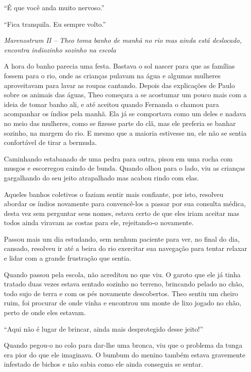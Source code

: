 ``É que você anda muito nervoso.''

``Fica tranquila. Eu sempre volto.''

\asterisc

\emph{Marenostrum II -- Theo toma banho de manhã no rio mas ainda está deslocado, encontra indiozinho sozinho na
escola}

A hora do banho parecia uma festa. Bastava o sol nascer para que as
famílias fossem para o rio, onde as crianças pulavam na água e algumas
mulheres aproveitavam para lavar as roupas cantando. Depois das
explicações de Paulo sobre os animais das águas, Theo começara a se
acostumar um pouco mais com a ideia de tomar banho ali, e até aceitou
quando Fernanda o chamou para acompanhar os índios pela manhã. Ela já se
comportava como um deles e nadava no meio das mulheres, como se fizesse
parte do clã, mas ele preferia se banhar sozinho, na margem do rio. E
mesmo que a maioria estivesse nu, ele não se sentia confortável de tirar
a bermuda.

Caminhando estabanado de uma pedra para outra, pisou em uma rocha com
musgos e escorregou caindo de bunda. Quando olhou para o lado, viu as
crianças gargalhando do seu jeito atrapalhado mas acabou rindo com elas.

Aqueles banhos coletivos o faziam sentir mais confiante, por isto,
resolveu abordar os índios novamente para convencê-los a passar por sua
consulta médica, desta vez sem perguntar seus nomes, estava certo de que
eles iriam aceitar mas todos ainda viravam as costas para ele,
rejeitando-o novamente.

Passou mais um dia estudando, sem nenhum paciente para ver, no final do
dia, cansado, resolveu ir até a beira do rio exercitar sua navegação
para tentar relaxar e lidar com a grande frustração que sentia.

Quando passou pela escola, não acreditou no que viu. O garoto que ele já
tinha tratado duas vezes estava sentado sozinho no terreno, brincando
pelado no chão, todo sujo de terra e com os pés novamente descobertos.
Theo sentiu um cheiro ruim, foi procurar de onde vinha e encontrou um
monte de lixo jogado no chão, perto de onde eles estavam.

``Aqui não é lugar de brincar, ainda mais desprotegido desse jeito!''

Quando pegou-o no colo para dar-lhe uma bronca, viu que o problema da
tunga era pior do que ele imaginava. O bumbum do menino também estava
gravemente infestado de bichos e não sabia como ele ainda conseguia se
sentar.

